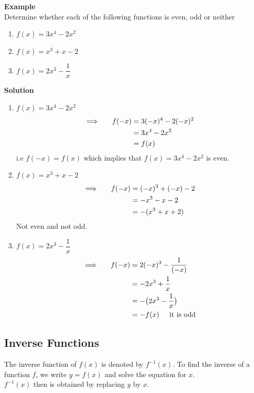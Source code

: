 \documentclass[11pt,a4paper]{article}
\begin{document}
\textbf{Example}\\
Determine whether each of the following functions is even, odd or neither
\begin{enumerate}
\item $f(x)=3x^4-2x^2$
\item $f(x)=x^3+x-2$
\item $f(x)=2x^3-\dfrac{1}{x}$\\
\end{enumerate}


\textbf{Solution}
\begin{enumerate}
\item $f(x)=3x^4-2x^2$
\begin{align*}
\implies \hspace{0.5cm} f(-x) & = 3(-x)^4-2(-x)^2\\
      & = 3x^4-2x^2\\
      & = f(x)
\end{align*}
i.e $f(-x)=f(x)$ which implies that $f(x)=3x^4-2x^2$ is even.\\

\item $f(x)=x^3+x-2$
\begin{align*}
\implies \hspace{0.5cm} f(-x) & = (-x)^3+(-x)-2\\
                              & = -x^3-x-2\\
                              & = -(x^3+x+2)
\end{align*}
Not even and not odd.\\

\item $f(x)=2x^3-\dfrac{1}{x}$
\begin{align*}
\implies \hspace{0.5cm} f(-x) & = 2(-x)^3-\frac{1}{(-x)}\\
                              & =-2x^3+\frac{1}{x}\\
                              & = -\big(2x^3-\frac{1}{x}\big)\\
                              & = -f(x)\hspace{0.5cm}\text{it is odd}\\
\end{align*}
\end{enumerate}




\subsection{Inverse Functions}
The inverse function of $f(x)$ is denoted by $f^{-1}(x)$. To find the inverse of a function $f$, we write $y=f(x)$ and solve the equation for $x$.\\
$f^{-1}(x)$ then is obtained by replacing $y$ by $x$.\\\\
\end{document}
